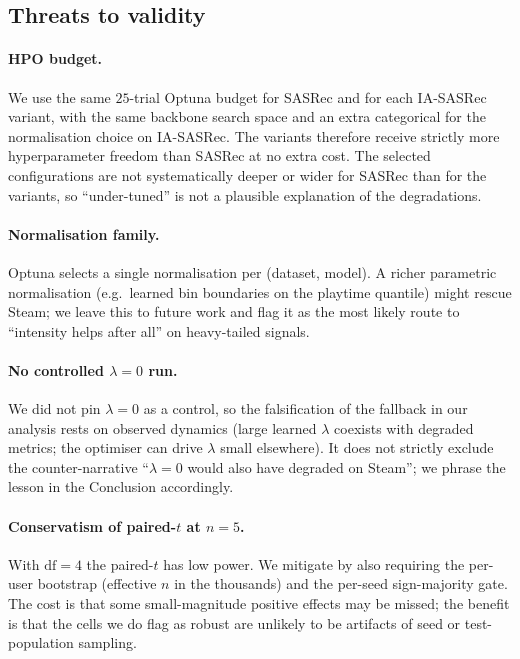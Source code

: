 \subsection{Threats to validity}

\paragraph{HPO budget.}
We use the same $25$-trial Optuna budget for SASRec and for each
IA-SASRec variant, with the same backbone search space and an extra
categorical for the normalisation choice on IA-SASRec. The variants
therefore receive strictly more hyperparameter freedom than
SASRec at no extra cost. The selected configurations are not
systematically deeper or wider for SASRec than for the variants, so
``under-tuned'' is not a plausible explanation of the degradations.

\paragraph{Normalisation family.}
Optuna selects a single normalisation per (dataset, model). A richer
parametric normalisation (e.g.\ learned bin boundaries on the playtime
quantile) might rescue Steam; we leave this to future work and flag
it as the most likely route to ``intensity helps after all'' on
heavy-tailed signals.

\paragraph{No controlled $\lambda{=}0$ run.}
We did not pin $\lambda{=}0$ as a control, so the falsification of the
fallback in our analysis rests on observed
dynamics (large learned $\lambda$ coexists with degraded metrics; the
optimiser can drive $\lambda$ small elsewhere). It does not
strictly exclude the counter-narrative ``$\lambda{=}0$ would also
have degraded on Steam''; we phrase the lesson in
the Conclusion accordingly.

\paragraph{Conservatism of paired-$t$ at $n{=}5$.}
With $\mathrm{df}{=}4$ the paired-$t$ has low power. We mitigate by
also requiring the per-user bootstrap (effective $n$ in the thousands)
and the per-seed sign-majority gate. The cost is that some
small-magnitude positive effects may be missed; the benefit is that
the cells we do flag as robust are unlikely to be artifacts of
seed or test-population sampling.

